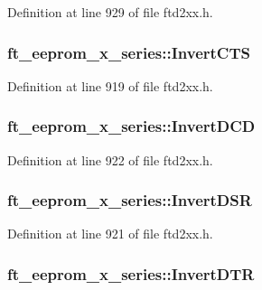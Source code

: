 Definition at line 929 of file ftd2xx.h.\hypertarget{structft__eeprom__x__series_a9930d06b5d32e4ca1bf6c9c85e208cea}{
\subsubsection[{InvertCTS}]{ {\bf ft\_\-eeprom\_\-x\_\-series::InvertCTS}}}
\label{structft__eeprom__x__series_a9930d06b5d32e4ca1bf6c9c85e208cea}


Definition at line 919 of file ftd2xx.h.\hypertarget{structft__eeprom__x__series_ab65f05c85d65e72b2faf17ebe126f2f0}{
\subsubsection[{InvertDCD}]{ {\bf ft\_\-eeprom\_\-x\_\-series::InvertDCD}}}
\label{structft__eeprom__x__series_ab65f05c85d65e72b2faf17ebe126f2f0}


Definition at line 922 of file ftd2xx.h.\hypertarget{structft__eeprom__x__series_a992ed18df69bfcce22ddf7e03bbcb484}{
\subsubsection[{InvertDSR}]{ {\bf ft\_\-eeprom\_\-x\_\-series::InvertDSR}}}
\label{structft__eeprom__x__series_a992ed18df69bfcce22ddf7e03bbcb484}


Definition at line 921 of file ftd2xx.h.\hypertarget{structft__eeprom__x__series_a9a25e68b1d2835a499fc4faeae418af8}{
\subsubsection[{InvertDTR}]{ {\bf ft\_\-eeprom\_\-x\_\-series::InvertDTR}}}
\label{structft__eeprom__x__series_a9a25e68b1d2835a499fc4faeae418af8}


